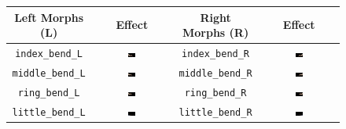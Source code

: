 \documentclass[../../main.tex]{subfiles}
\begin{document}
\begin{figure}
    \centering
    \begin{tabular}{|c|c|c|c|}
        \hline
        \textbf{Left Morphs (L)} & \textbf{Effect} & \textbf{Right Morphs (R)} & \textbf{Effect} \\ 
        \hline
        \texttt{index\_bend\_L} & \includegraphics[width=0.1\textwidth]{chapters/avatar_creation_pose_synthesis/images/morph_renders/index_bend_L_morph.png} & 
        \texttt{index\_bend\_R} & \includegraphics[width=0.1\textwidth]{chapters/avatar_creation_pose_synthesis/images/morph_renders/index_bend_R_morph.png} \\

        \texttt{middle\_bend\_L} & \includegraphics[width=0.1\textwidth]{chapters/avatar_creation_pose_synthesis/images/morph_renders/middle_bend_L_morph.png} &
        \texttt{middle\_bend\_R} & \includegraphics[width=0.1\textwidth]{chapters/avatar_creation_pose_synthesis/images/morph_renders/middle_bend_R_morph.png} \\

        \texttt{ring\_bend\_L} & \includegraphics[width=0.1\textwidth]{chapters/avatar_creation_pose_synthesis/images/morph_renders/ring_bend_L_morph.png} &
        \texttt{ring\_bend\_R} & \includegraphics[width=0.1\textwidth]{chapters/avatar_creation_pose_synthesis/images/morph_renders/ring_bend_R_morph.png} \\

        \texttt{little\_bend\_L} & \includegraphics[width=0.1\textwidth]{chapters/avatar_creation_pose_synthesis/images/morph_renders/little_bend_L_morph.png} & 
        \texttt{little\_bend\_R} & \includegraphics[width=0.1\textwidth]{chapters/avatar_creation_pose_synthesis/images/morph_renders/little_bend_R_morph.png} \\


\end{tabular}
\end{figure}
\end{document}
